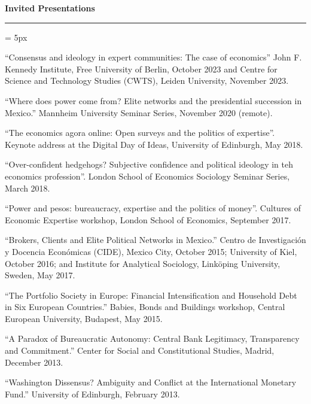 \documentclass[12pt,letterpaper]{article}
\renewcommand{\labelitemi}{$$}
\newcommand{\sectionhead}[1]{\begin{flushleft}\large\bf{#1}\vspace{.1cm}\hrule\end{flushleft}}
\begin{document}
\sectionhead{Invited Presentations}
\begin{list}{\labelitemi}{\leftmargin = 5px}
	
\item ``Consensus and ideology in expert communities: The case of economics'' John F. Kennedy Institute, Free University of Berlin, October 2023 and Centre for Science and Technology Studies (CWTS), Leiden University, November 2023.
	
\item ``Where does power come from?  Elite networks and the presidential succession in Mexico.''  Mannheim University Seminar Series, November 2020 (remote).	

\item ``The economics agora online: Open surveys and the politics of expertise''.  Keynote address at the Digital Day of Ideas, University of Edinburgh, May 2018.

\item ``Over-confident hedgehogs?  Subjective confidence and political ideology in teh economics profession''.  London School of Economics Sociology Seminar Series, March 2018.

\item``Power and pesos: bureaucracy, expertise and the politics of money''.  Cultures of Economic Expertise workshop, London School of Economics, September 2017.

\item``Brokers, Clients and Elite Political Networks in Mexico.''  Centro de Investigaci\'on y Docencia Econ\'omicas (CIDE), Mexico City, October 2015; University of Kiel, October 2016; and Institute for Analytical Sociology, Link{\"o}ping University, Sweden, May 2017.

\item``The Portfolio Society in Europe: Financial Intensification and Household Debt in Six European Countries.'' Babies, Bonds and Buildings workshop, Central European University, Budapest, May 2015.

\item``A Paradox of Bureaucratic Autonomy: Central Bank Legitimacy, Transparency and Commitment.'' Center for Social and Constitutional Studies, Madrid, December 2013. 

\item``Washington Dissensus? Ambiguity and Conflict at the International Monetary Fund.'' University of Edinburgh, February 2013.
\end{list}
\end{document}
